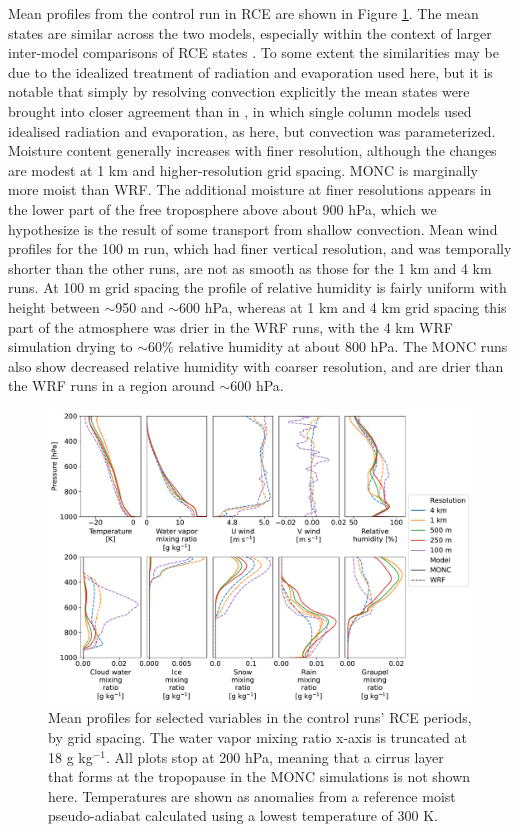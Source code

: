 \documentclass[draft]{agujournal2019}
\begin{document}
Mean profiles from the control run in RCE are shown in Figure
\ref{fig:rce_profiles}. The mean states are similar across the two models,
especially within the context of larger inter-model comparisons of RCE states
\cite[e.g.]{Hwong_JAMES_2021}. To some extent the similarities may be due to the
idealized treatment of radiation and evaporation used here, but it is notable
that simply by resolving convection explicitly the mean states were brought into
closer agreement than in \cite{Hwong_JAMES_2021}, in which single column models
used idealised radiation and evaporation, as here, but convection was
parameterized. Moisture content generally increases with finer resolution,
although the changes are modest at 1 km and higher-resolution grid spacing. MONC
is marginally more moist than WRF. The additional moisture at finer resolutions
appears in the lower part of the free troposphere above about 900 hPa, which we
hypothesize is the result of some transport from shallow convection. Mean wind
profiles for the 100 m run, which had finer vertical resolution, and was
temporally shorter than the other runs, are not as smooth as those for the 1 km
and 4 km runs. At 100 m grid spacing the profile of relative humidity is fairly
uniform with height between $\sim$950 and $\sim$600 hPa, whereas at 1 km and 4
km grid spacing this part of the atmosphere was drier in the WRF runs, with the
4 km WRF simulation drying to $\sim$60\% relative humidity at about 800 hPa. The
MONC runs also show decreased relative humidity with coarser resolution, and are
drier than the WRF runs in a region around $\sim$600 hPa.

\begin{figure}[pth]
    \noindent\includegraphics[width=\textwidth]{figures/rce_profiles}
    \caption{Mean profiles for selected variables in the control runs' RCE
    periods, by grid spacing. The water vapor mixing ratio x-axis is truncated
    at 18 g kg$^{-1}$. All plots stop at 200 hPa, meaning that a cirrus layer
    that forms at the tropopause in the MONC simulations is not shown here.
    Temperatures are shown as anomalies from a reference moist pseudo-adiabat
    calculated using a lowest temperature of 300 K.}
    \label{fig:rce_profiles}
\end{figure}
\end{document}
